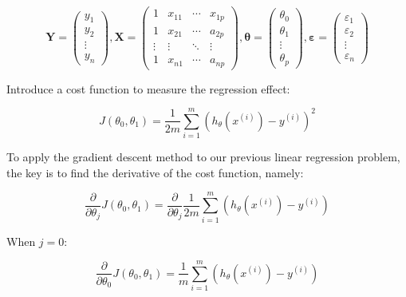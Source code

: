 \documentclass{mcmthesis}
\begin{document}
\begin{equation}
  \boldsymbol{Y}=\left(\begin{array}{c}
  y_{1} \\
  y_{2} \\
  \vdots \\
  y_{n}
  \end{array}\right), \boldsymbol{X}=\left(\begin{array}{cccc}
  1 & x_{11} & \cdots & x_{1 p} \\
  1 & x_{21} & \cdots & a_{2 p} \\
  \vdots & \vdots & \ddots & \vdots \\
  1 & x_{n 1} & \cdots & a_{n p}
  \end{array}\right), \boldsymbol{\theta}=\left(\begin{array}{c}
  \theta_{0} \\
  \theta_{1} \\
  \vdots \\
  \theta_{p}
  \end{array}\right), \boldsymbol{\varepsilon}=\left(\begin{array}{c}
  \varepsilon_{1} \\
  \varepsilon_{2} \\
  \vdots \\
  \varepsilon_{n}
  \end{array}\right)
\end{equation}

Introduce a cost function to measure the regression effect:

\begin{equation}
  J\left(\theta_{0}, \theta_{1}\right)=\frac{1}{2 m} \sum_{i=1}^{m}\left(h_{\theta}\left(x^{(i)}\right)-y^{(i)}\right)^{2}
\end{equation}

To apply the gradient descent method to our previous linear regression problem, the key is to find the derivative of the cost function, namely: 

\begin{equation}
  \frac{\partial}{\partial \theta_{j}} J\left(\theta_{0}, \theta_{1}\right)=\frac{\partial}{\partial \theta_{j}} \frac{1}{2 m} \sum_{i=1}^{m}\left(h_{\theta}\left(x^{(i)}\right)-y^{(i)}\right)
\end{equation}

When $ j=0 $:

\begin{equation}
  \frac{\partial}{\partial \theta_{0}} J\left(\theta_{0}, \theta_{1}\right)=\frac{1}{m} \sum_{i=1}^{m}\left(h_{\theta}\left(x^{(i)}\right)-y^{(i)}\right)
\end{equation}
\end{document}
